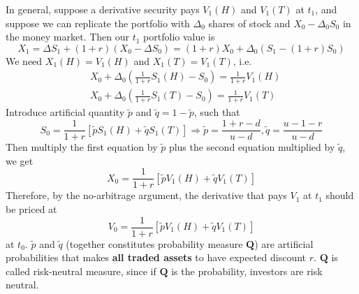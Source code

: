 \documentclass[a4paper]{article}
\begin{document}
In general, suppose a derivative security pays $V_1(H)$ and $V_1(T)$ at $t_1$, and suppose we can replicate the portfolio with $\Delta_0$ shares of stock and $X_0-\Delta_0S_0$ in the money market. Then our $t_1$ portfolio value is 
$$X_1 = \Delta S_1+(1+r)(X_0-\Delta S_0) = (1+r)X_0+\Delta_0(S_1-(1+r)S_0)$$
We need $X_1(H) = V_1(H)$ and $X_1(T) = V_1(T)$, i.e.
\begin{align*}&X_0 + \Delta_0\left(\frac{1}{1+r}S_1(H) - S_0\right)=\frac{1}{1+r}V_1(H)\\
&X_0+\Delta_0\left(\frac{1}{1+r}S_1(T)-S_0\right) = \frac{1}{1+r}V_1(T)\end{align*}
Introduce artificial quantity $\tilde{p}$ and $\tilde{q}=1-\tilde{p}$, such that $$S_0 = \frac{1}{1+r}\left[\tilde{p}S_1(H)+\tilde{q}S_1(T)\right]\Longrightarrow \tilde{p} = \frac{1+r-d}{u-d}, \tilde{q} = \frac{u-1-r}{u-d}$$
Then multiply the first equation by $\tilde{p}$ plus the second equation multiplied by $\tilde{q}$, we get 
$$X_0 =\frac{1}{1+r}[\tilde{p}V_1(H)+\tilde{q}V_1(T)]$$
Therefore, by the no-arbitrage argument, the derivative that pays $V_1$ at $t_1$ should be priced at $$V_0=\frac{1}{1+r}[\tilde{p}V_1(H)+\tilde{q}V_1(T)]$$ at $t_0$. 
$\tilde{p}$ and $\tilde{q}$ (together constitutes probability measure $\mathbf{Q}$) are artificial probabilities that makes \textbf{all traded assets} to have expected discount $r$. $\mathbf{Q}$ is called risk-neutral measure, since if $\mathbf{Q}$ is the probability, investors are risk neutral.
\end{document}

